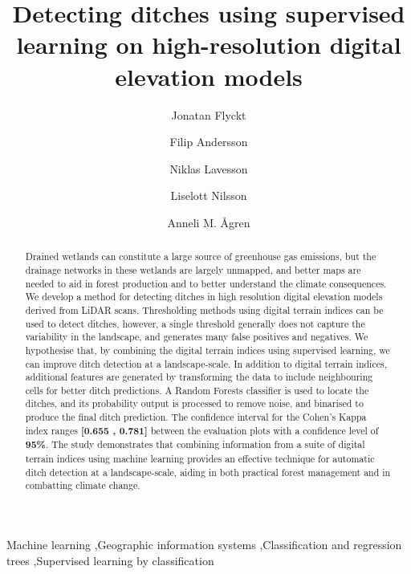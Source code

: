 \documentclass[11pt, review]{elsarticle} %
\begin{document}
\begin{frontmatter}
\title{Detecting ditches using supervised learning on high-resolution digital elevation models}

\author[ju]{Jonatan Flyckt}

\author[ju]{Filip Andersson}

\author[ju]{Niklas Lavesson}

\author[fa]{Liselott Nilsson}

\author[slu]{Anneli M. \AA gren}

\address[ju]{Department of Computer Science, School of Engineering, J\"onk\"oping University, Gjuterigatan 5, 553 18, J\"onk\"oping, Sweden}
\address[fa]{Forest Department, Swedish Forest Agency, Skeppargatan 17, 931 32 Skellefte\aa, Sweden}
\address[slu]{Department of Forest Ecology and Management, Swedish University of Agricultural Sciences, SLU, Skogsmarksgr\"and 17, 901 83, Ume\aa, Sweden}

\begin{abstract}
{\footnotesize
Drained wetlands can constitute a large source of greenhouse gas emissions, but the drainage networks in these wetlands are largely unmapped, and better maps are needed to aid in forest production and to better understand the climate consequences. We develop a method for detecting ditches in high resolution digital elevation models derived from LiDAR scans. Thresholding methods using digital terrain indices can be used to detect ditches, however, a single threshold generally does not capture the variability in the landscape, and generates many false positives and negatives. We hypothesise that, by combining the digital terrain indices using supervised learning, we can improve ditch detection at a landscape-scale. In addition to digital terrain indices, additional features are generated by transforming the data to include neighbouring cells for better ditch predictions. A Random Forests classifier is used to locate the ditches, and its probability output is processed to remove noise, and binarised to produce the final ditch prediction. The confidence interval for the Cohen's Kappa index ranges \textbf{[0.655 , 0.781]} between the evaluation plots with a confidence level of \textbf{95\%}. The study demonstrates that combining information from  a suite of digital terrain indices using machine learning provides an effective technique for automatic ditch detection at a landscape-scale, aiding in both practical forest management and in combatting climate change.}
\end{abstract}

\begin{keyword}
{\footnotesize
Machine learning \sep Geographic information systems \sep Classification and regression trees \sep Supervised learning by classification}
\end{keyword}

\end{frontmatter}
\end{document}
